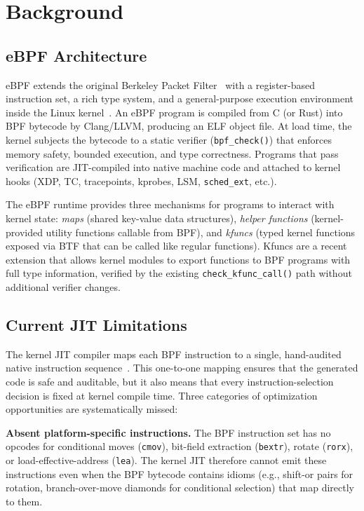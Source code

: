 \documentclass[sigconf,anonymous]{acmart}
\begin{document}
\section{Background}
\label{sec:background}

\subsection{eBPF Architecture}

eBPF extends the original Berkeley Packet Filter~\cite{ebpf_sosp}
with a register-based instruction set, a rich type system, and a
general-purpose execution environment inside the Linux
kernel~\cite{bpf_lwn}. An eBPF program is compiled from C (or Rust)
into BPF bytecode by Clang/LLVM, producing an ELF object file. At
load time, the kernel subjects the bytecode to a static verifier
(\texttt{bpf\_check()}) that enforces memory safety, bounded
execution, and type correctness. Programs that pass verification are
JIT-compiled into native machine code and attached to kernel hooks
(XDP, TC, tracepoints, kprobes, LSM, \texttt{sched\_ext}, etc.).

The eBPF runtime provides three mechanisms for programs to interact
with kernel state: \emph{maps} (shared key-value data structures),
\emph{helper functions} (kernel-provided utility functions callable
from BPF), and \emph{kfuncs} (typed kernel functions exposed via BTF
that can be called like regular functions). Kfuncs are a recent
extension that allows kernel modules to export functions to BPF
programs with full type information, verified by the existing
\texttt{check\_kfunc\_call()} path without additional verifier
changes.

\subsection{Current JIT Limitations}

The kernel JIT compiler maps each BPF instruction to a single,
hand-audited native instruction sequence~\cite{linux_bpf_jit}. This
one-to-one mapping ensures that the generated code is safe and
auditable, but it also means that every instruction-selection decision
is fixed at kernel compile time. Three categories of optimization
opportunities are systematically missed:

\textbf{Absent platform-specific instructions.} The BPF instruction
set has no opcodes for conditional moves (\texttt{cmov}), bit-field
extraction (\texttt{bextr}), rotate (\texttt{rorx}), or
load-effective-address (\texttt{lea}). The kernel JIT therefore cannot
emit these instructions even when the BPF bytecode contains idioms
(e.g., shift-or pairs for rotation, branch-over-move diamonds for
conditional selection) that map directly to them.
\end{document}
